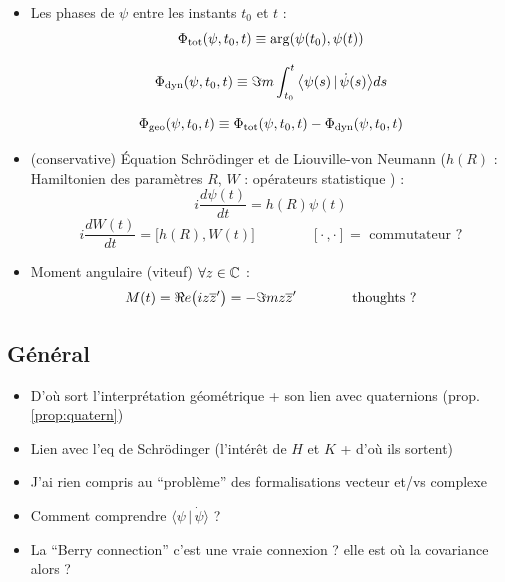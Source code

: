 \begin{itemize}
	\item Les phases de $\psi$ entre les instants $t_0$ et $t$ :
	\begin{equation}\label{eq:phase_tot}
		\Phi_{\text{tot}}(\psi, t_0, t) \equiv \arg(\psi(t_0), \psi(t))
	\end{equation}
	
	\begin{equation}\label{eq:phase_dyn}
		\Phi_{\text{dyn}}(\psi,t_0,t) \equiv \Im m \int_{t_0}^t\big\langle \psi(s) \,|\, \dot{\psi}(s) \big\rangle ds
	\end{equation}
	
	\begin{equation}\label{eq:phase_geo}
		\Phi_{\text{geo}}(\psi, t_0, t) \equiv  \Phi_{\text{tot}}(\psi, t_0, t) - \Phi_{\text{dyn}}(\psi,t_0,t)
	\end{equation}
	
	\item (conservative) Équation Schrödinger et de Liouville-von Neumann ($h(R)$ : Hamiltonien des paramètres $R$, $W$ : opérateurs statistique ) \cite[p.6]{bohm_geometric_2003} :
	\begin{equation}\label{eq:schrodinger}
		i\frac{d \psi(t)}{dt} = h(R)\psi(t)
	\end{equation}
	\begin{equation}\label{eq:liouville-neumann}
		i\frac{d W(t)}{dt} = \big[h(R),W(t)\big] \qquad\qquad [\cdot\,,\cdot]=\text{ commutateur ?}
	\end{equation}
	
	\item Moment angulaire (viteuf) $\forall z\in\mathbb{C}$ :
	\begin{equation}\label{eq:mom_angu}
		M(t) = \Re e \big(iz\overline{z}'\big) = -\Im m z\overline{z}'  \qquad\qquad \text{thoughts ?}
	\end{equation}
	
\end{itemize}


\subsection{Général}

\begin{itemize}
	\item D'où sort l'interprétation géométrique + son lien avec quaternions (prop. \ref{prop:quatern})
	\item Lien avec l'eq de Schrödinger (l'intérêt de $H$ et $K$ + d'où ils sortent)
	\item J'ai rien compris au ``problème'' des formalisations vecteur et/vs complexe
	\item Comment comprendre $\big\langle \psi\, |\, \dot{\psi} \big\rangle$ ?
	
	\item La ``Berry connection'' c'est une vraie connexion ? elle est où la covariance alors ?
\end{itemize}

